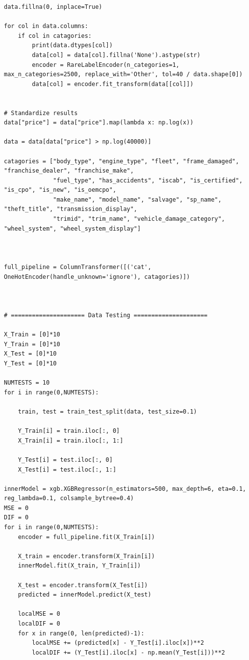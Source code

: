 \documentclass{article}
\begin{document}
\begin{lstlisting}
data.fillna(0, inplace=True)

for col in data.columns:
    if col in catagories:
        print(data.dtypes[col])
        data[col] = data[col].fillna('None').astype(str)
        encoder = RareLabelEncoder(n_categories=1, max_n_categories=2500, replace_with='Other', tol=40 / data.shape[0])
        data[col] = encoder.fit_transform(data[[col]])


# Standardize results
data["price"] = data["price"].map(lambda x: np.log(x))

data = data[data["price"] > np.log(40000)]

catagories = ["body_type", "engine_type", "fleet", "frame_damaged", "franchise_dealer", "franchise_make",
              "fuel_type", "has_accidents", "iscab", "is_certified", "is_cpo", "is_new", "is_oemcpo",
              "make_name", "model_name", "salvage", "sp_name", "theft_title", "transmission_display",
              "trimid", "trim_name", "vehicle_damage_category", "wheel_system", "wheel_system_display"]



full_pipeline = ColumnTransformer([('cat', OneHotEncoder(handle_unknown='ignore'), catagories)])



# ===================== Data Testing =====================

X_Train = [0]*10
Y_Train = [0]*10
X_Test = [0]*10
Y_Test = [0]*10

NUMTESTS = 10
for i in range(0,NUMTESTS):

    train, test = train_test_split(data, test_size=0.1)

    Y_Train[i] = train.iloc[:, 0]
    X_Train[i] = train.iloc[:, 1:]

    Y_Test[i] = test.iloc[:, 0]
    X_Test[i] = test.iloc[:, 1:]

innerModel = xgb.XGBRegressor(n_estimators=500, max_depth=6, eta=0.1, reg_lambda=0.1, colsample_bytree=0.4)
MSE = 0
DIF = 0
for i in range(0,NUMTESTS):
    encoder = full_pipeline.fit(X_Train[i])

    X_train = encoder.transform(X_Train[i])
    innerModel.fit(X_train, Y_Train[i])

    X_test = encoder.transform(X_Test[i])
    predicted = innerModel.predict(X_test)

    localMSE = 0
    localDIF = 0
    for x in range(0, len(predicted)-1):
        localMSE += (predicted[x] - Y_Test[i].iloc[x])**2
        localDIF += (Y_Test[i].iloc[x] - np.mean(Y_Test[i]))**2


\end{lstlisting}
\end{document}
